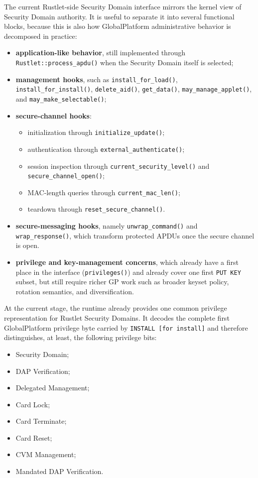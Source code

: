 The current Rustlet-side Security Domain interface mirrors the kernel
view of Security Domain authority. It is useful to separate it into
several functional blocks, because this is also how GlobalPlatform
administrative behavior is decomposed in practice:
\begin{itemize}
\item \textbf{application-like behavior}, still implemented through
  \texttt{Rustlet::process\_apdu()} when the Security Domain itself is
  selected;
\item \textbf{management hooks}, such as
  \texttt{install\_for\_load()},
  \texttt{install\_for\_install()}, \texttt{delete\_aid()},
  \texttt{get\_data()}, \texttt{may\_manage\_applet()}, and
  \texttt{may\_make\_selectable()};
\item \textbf{secure-channel hooks}:
  \begin{itemize}
  \item initialization through \texttt{initialize\_update()};
  \item authentication through \texttt{external\_authenticate()};
  \item session inspection through \texttt{current\_security\_level()} and
    \texttt{secure\_channel\_open()};
  \item MAC-length queries through \texttt{current\_mac\_len()};
  \item teardown through \texttt{reset\_secure\_channel()}.
  \end{itemize}
\item \textbf{secure-messaging hooks}, namely
  \texttt{unwrap\_command()} and \texttt{wrap\_response()}, which
  transform protected APDUs once the secure channel is open.
\item \textbf{privilege and key-management concerns}, which already have
  a first place in the interface (\texttt{privileges()}) and already
  cover one first \texttt{PUT KEY} subset, but still require richer GP
  work such as broader keyset policy, rotation semantics, and
  diversification.
\end{itemize}

At the current stage, the runtime already provides one common privilege
representation for Rustlet Security Domains. It decodes the complete
first GlobalPlatform privilege byte carried by
\texttt{INSTALL [for install]} and therefore distinguishes, at least,
the following privilege bits:
\begin{itemize}
\item Security Domain;
\item DAP Verification;
\item Delegated Management;
\item Card Lock;
\item Card Terminate;
\item Card Reset;
\item CVM Management;
\item Mandated DAP Verification.
\end{itemize}

